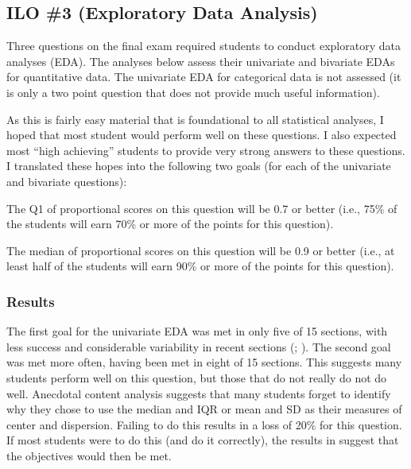 \documentclass{article}\usepackage[]{graphicx}\usepackage[]{color}
\begin{document}
\clearpage
\subsection{ILO \#3 (Exploratory Data Analysis)}
Three questions on the final exam required students to conduct exploratory data analyses (EDA). The analyses below assess their univariate and bivariate EDAs for quantitative data. The univariate EDA for categorical data is not assessed (it is only a two point question that does not provide much useful information).

As this is fairly easy material that is foundational to all statistical analyses, I hoped that most student would perform well on these questions. I also expected most ``high achieving'' students to provide very strong answers to these questions. I translated these hopes into the following two goals (for each of the univariate and bivariate questions):

\begin{Enumerate}
  \item The Q1 of proportional scores on this question will be 0.7 or better (i.e., 75\% of the students will earn 70\% or more of the points for this question).
  \item The median of proportional scores on this question will be 0.9 or better (i.e., at least half of the students will earn 90\% or more of the points for this question).
\end{Enumerate}

\subsubsection{Results}
\vspace{-12pt}

The first goal for the univariate EDA was met in only five of 15 sections, with less success and considerable variability in recent sections (; ). The second goal was met more often, having been met in eight of 15 sections. This suggests many students perform well on this question, but those that do not really do not do well. Anecdotal content analysis suggests that many students forget to identify why they chose to use the median and IQR or mean and SD as their measures of center and dispersion. Failing to do this results in a loss of 20\% for this question. If most students were to do this (and do it correctly), the results in  suggest that the objectives would then be met.
\end{document}
